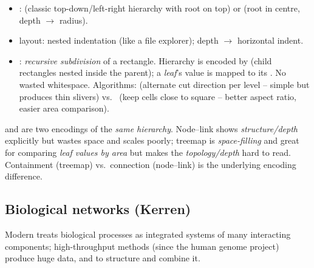 \begin{keybox}
\begin{itemize}
  \item {}:  (classic top-down/left-right
  hierarchy with root on top) or  (root in centre, depth $\to$
  radius).
  \item {} layout: nested indentation (like a file
  explorer); depth $\to$ horizontal indent.
  \item {}: \emph{recursive subdivision} of a rectangle.
  Hierarchy is encoded by  (child rectangles nested inside the
  parent); a \emph{leaf}'s value is mapped to its . No wasted
  whitespace. Algorithms:  (alternate cut direction per
  level -- simple but produces thin slivers) vs.\  (keep cells
  close to square -- better aspect ratio, easier area comparison).
\end{itemize}
\end{keybox}

\begin{exambox}
 and  are two encodings of the
\emph{same hierarchy}. Node--link shows \emph{structure/depth} explicitly but
wastes space and scales poorly; treemap is \emph{space-filling} and great for
comparing \emph{leaf values by area} but makes the \emph{topology/depth} hard to
read. Containment (treemap) vs.\ connection (node--link) is the underlying
encoding difference.
\end{exambox}

\subsection{Biological networks (Kerren)}

Modern  treats biological processes as integrated systems
of many interacting components; high-throughput methods (since the human genome
project) produce huge data, and  to structure
and combine it.


